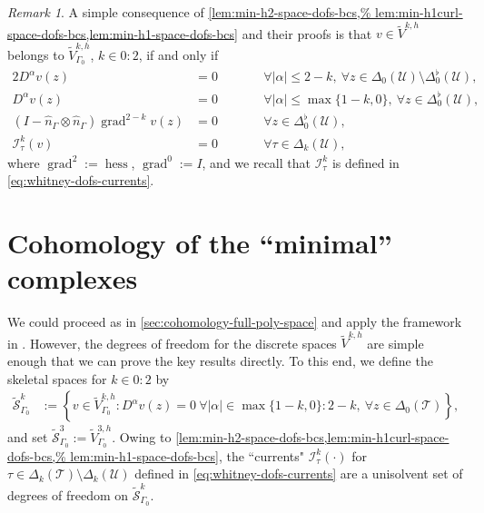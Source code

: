 \documentclass{mcom-l}
\theoremstyle{definition}
\theoremstyle{remark}
\newtheorem{remark}[theorem]{Remark}
\numberwithin{equation}{section}
\newcommand{\unitvec}[1]{\hat{#1}}
\DeclareMathOperator{\grad}{grad}
\DeclareMathOperator{\hess}{hess}
\newcommand{\mesh}[0]{\mathcal{T}}
\newcommand{\boundarymesh}[0]{\mathcal{U}}
\begin{document}
\begin{remark}
	\label{rem:remove-dofs-to-get-bcs}
	A simple consequence of \cref{lem:min-h2-space-dofs-bcs,%
		lem:min-h1curl-space-dofs-bcs,lem:min-h1-space-dofs-bcs}
	and their proofs is that $v \in \tilde{V}^{k, h}$ belongs 
	to $\tilde{V}^{k, h}_{\Gamma_0}$, $k \in 0:2$, if and only if 
	\begin{alignat*}{2}
		D^{\alpha} v(z) &= 0 \qquad & &\forall |\alpha| \leq 2-k, 
		\ \forall z \in \Delta_0(\boundarymesh) 
		\setminus \Delta_0^{\flat}(\boundarymesh), \\
		D^{\alpha} v(z) &= 0 \qquad & &\forall |\alpha| \leq \max\{ 1-k, 0\}, 
		\ \forall z \in \Delta_0^{\flat}(\boundarymesh), \\
		(I - \unitvec{n}_{\Gamma} \otimes \unitvec{n}_{\Gamma}) \grad^{2-k} v(z)
		&= 0 \qquad & & \forall z \in \Delta_0^{\flat}(\boundarymesh), \\
		\mathcal{I}^k_{\tau}(v) &= 0 \qquad 
		& &\forall \tau \in \Delta_k(\boundarymesh),
	\end{alignat*}
	where $\grad^2 := \hess$, $\grad^0 := I$, and we recall that 
	$\mathcal{I}^k_{\tau}$ is defined in \cref{eq:whitney-dofs-currents}.
\end{remark}

\section{Cohomology of the ``minimal'' complexes}
\label{sec:cohomology-reduced}

We could proceed as in \cref{sec:cohomology-full-poly-space} and 
apply the framework in \cite{HuLiangLin25}. However, the degrees of 
freedom for the discrete spaces $\tilde{V}^{k, h}$ are simple enough 
that we can prove the key results directly. To this end, we define 
the skeletal spaces for $k \in 0:2$ by 
\begin{align*}
	\tilde{\mathcal{S}}^{k}_{\Gamma_0} &:= 
	\left\{ v \in \tilde{V}^{k, h}_{\Gamma_0} : D^{\alpha} v(z) = 0 
	\ \forall |\alpha| \in \max\{1-k, 0\} : 2-k, 
	\ \forall z \in \Delta_0(\mesh) \right\},
\end{align*}
and set $\tilde{\mathcal{S}}^3_{\Gamma_0} := \tilde{V}^{3, h}_{\Gamma_0}$. Owing 
to \cref{lem:min-h2-space-dofs-bcs,lem:min-h1curl-space-dofs-bcs,%
	lem:min-h1-space-dofs-bcs}, the ``currents" 
$\mathcal{I}^k_{\tau}(\cdot)$ for
${\tau \in \Delta_k(\mesh) \setminus \Delta_k(\boundarymesh)}$
defined in \cref{eq:whitney-dofs-currents} are a unisolvent set of 
degrees of freedom on $\tilde{\mathcal{S}}^{k}_{\Gamma_0}$.
\end{document}
